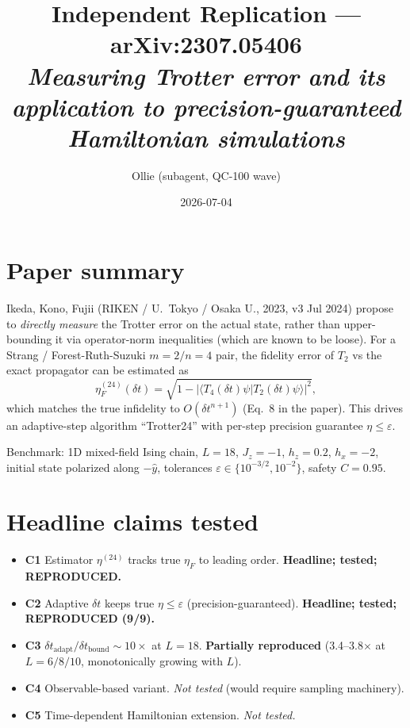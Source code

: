 \documentclass[11pt]{article}
\title{Independent Replication --- arXiv:2307.05406\\
{\large \emph{Measuring Trotter error and its application to precision-guaranteed Hamiltonian simulations}}}
\author{Ollie (subagent, QC-100 wave)}
\date{2026-07-04}
\begin{document}
\maketitle

\section{Paper summary}

Ikeda, Kono, Fujii (RIKEN / U.~Tokyo / Osaka U., 2023, v3 Jul 2024) propose to
\emph{directly measure} the Trotter error on the actual state, rather than upper-bounding
it via operator-norm inequalities (which are known to be loose). For a Strang / Forest-Ruth-Suzuki
$m=2 / n=4$ pair, the fidelity error of $T_2$ vs the exact propagator can be estimated as
\begin{equation}
  \eta_F^{(24)}(\delta t) = \sqrt{1 - |\langle T_4(\delta t)\psi | T_2(\delta t)\psi\rangle|^2},
\end{equation}
which matches the true infidelity to $O(\delta t^{n+1})$ (Eq.~8 in the paper). This drives an
adaptive-step algorithm ``Trotter24'' with per-step precision guarantee $\eta \le \varepsilon$.

Benchmark: 1D mixed-field Ising chain, $L=18$, $J_z=-1$, $h_z=0.2$, $h_x=-2$, initial state
polarized along $-\hat{y}$, tolerances $\varepsilon\in\{10^{-3/2},10^{-2}\}$, safety $C=0.95$.

\section{Headline claims tested}

\begin{itemize}
  \item \textbf{C1} Estimator $\eta^{(24)}$ tracks true $\eta_F$ to leading order. \textbf{Headline; tested; REPRODUCED.}
  \item \textbf{C2} Adaptive $\delta t$ keeps true $\eta \le \varepsilon$ (precision-guaranteed). \textbf{Headline; tested; REPRODUCED (9/9).}
  \item \textbf{C3} $\delta t_{\mathrm{adapt}} / \delta t_{\mathrm{bound}} \sim 10\times$ at $L=18$. \textbf{Partially reproduced} (3.4--3.8$\times$ at $L=6/8/10$, monotonically growing with $L$).
  \item \textbf{C4} Observable-based variant. \emph{Not tested} (would require sampling machinery).
  \item \textbf{C5} Time-dependent Hamiltonian extension. \emph{Not tested.}
\end{itemize}
\end{document}

